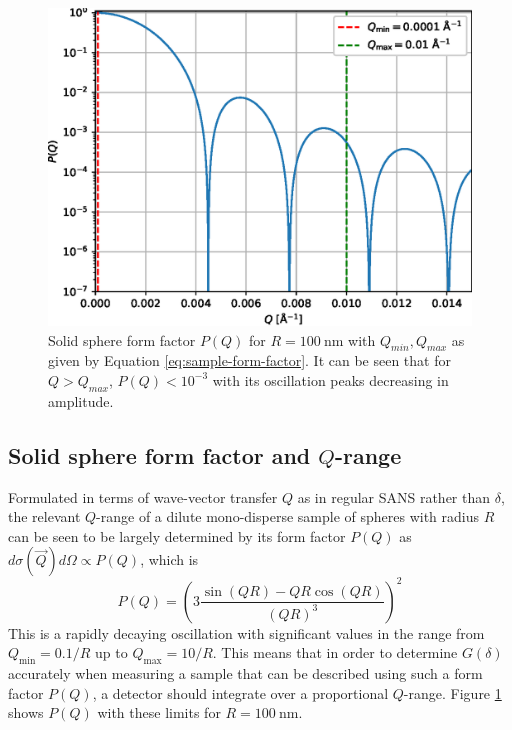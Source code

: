 \begin{figure}[h]
	\centering
	\includegraphics[width=0.5\linewidth]{analytical-P-log}
	\caption{Solid sphere form factor $P(Q)$ for $R = \SI{100}{\nano\meter}$ with $Q_{min}, Q_{max}$ as given by Equation \eqref{eq:sample-form-factor}. It can be seen that for $Q > Q_{max}$, $P(Q) < 10^{-3}$ with its oscillation peaks decreasing in amplitude.}
	\label{fig:analytical-P}
\end{figure}
\subsection{Solid sphere form factor and $Q$-range}
Formulated in terms of wave-vector transfer $Q$ as in regular SANS rather than $\delta$, the relevant $Q$-range of a dilute mono-disperse sample of spheres with radius $R$ can be seen to be largely determined by its form factor $P(Q)$ as $d\sigma(\vec{Q})d\Omega\propto P(Q)$, which is \cite{rekveldt1996}
\begin{equation}
	P(Q) = \left(3\frac{\sin(QR) - QR\cos(QR)}{\left(QR\right)^3}\right)^2\label{eq:sample-form-factor}
\end{equation}
This is a rapidly decaying oscillation with significant values in the range from $Q_{\text{min}} = 0.1/R$ up to $Q_{\text{max}} = 10/R$. This means that in order to determine $G(\delta)$ accurately when measuring a sample that can be described using such a form factor $P(Q)$, a detector should integrate over a proportional $Q$-range.  Figure \ref{fig:analytical-P} shows $P(Q)$ with these limits for $R = \SI{100}{\nano\meter}$.  
